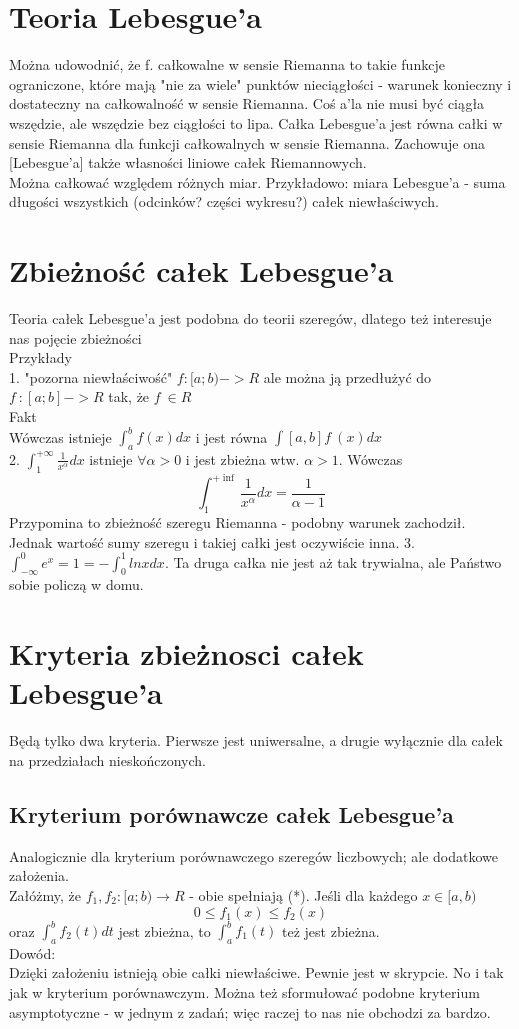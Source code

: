\documentclass[12pt,a4paper,article]{memoir} %
\begin{document}
\section{Teoria Lebesgue'a}
Można udowodnić, że f. całkowalne w sensie Riemanna to takie funkcje ograniczone, które mają "nie za wiele" punktów nieciągłości - warunek konieczny i dostateczny na całkowalność w sensie Riemanna. Coś a'la nie musi być ciągła wszędzie, ale wszędzie bez ciągłości to lipa.
Całka Lebesgue'a jest równa całki w sensie Riemanna dla funkcji całkowalnych w sensie Riemanna. Zachowuje ona [Lebesgue'a] także własności liniowe całek Riemannowych. \\
Można całkować względem różnych miar. Przykładowo: miara Lebesgue'a - suma długości wszystkich (odcinków? części wykresu?) całek niewłaściwych.
\section{Zbieżność całek Lebesgue'a}
Teoria całek Lebesgue'a jest podobna do teorii szeregów, dlatego też interesuje nas pojęcie zbieżności \\
Przykłady \\
1. "pozorna niewłaściwość"
$f : [a;b) -> R$ ale można ją przedłużyć do \\
$f^{~} : [a;b] -> R $ tak, że $ f^{~} \in R$ \\
Fakt \\
Wówczas istnieje $\int_{a}^{b} f(x) dx$ i jest równa $\int[a,b] f^{~}(x)dx $ \\
2. $ \int_{1}^{+\infty} \frac{1}{x^\alpha} dx $ istnieje $ \forall \alpha > 0 $ i jest zbieżna wtw. $ \alpha > 1 $. Wówczas \[ \int_{1}^{+\inf} \frac{1}{x^\alpha} dx = \frac{1}{\alpha - 1} \]
Przypomina to zbieżność szeregu Riemanna - podobny warunek zachodził. Jednak wartość sumy szeregu i takiej całki jest oczywiście inna.
3. $ \int_{-\infty}^{0} e^x = 1 = -\int_{0}^{1} lnx dx $. Ta druga całka nie jest aż tak trywialna, ale Państwo sobie policzą w domu.
\section{Kryteria zbieżnosci całek Lebesgue'a}
Będą tylko dwa kryteria. Pierwsze jest uniwersalne, a drugie wyłącznie dla całek na przedziałach nieskończonych.
\subsection{Kryterium porównawcze całek Lebesgue'a}
Analogicznie dla kryterium porównawczego szeregów liczbowych; ale dodatkowe założenia. \\
Załóżmy, że $f_1, f_2 : [a;b) \to R $ - obie spełniają (*).
Jeśli dla każdego $ x \in [a,b) $
\[ 0 \leq f_1(x) \leq f_2(x) \]
oraz $ \int_a^b f_2 (t)dt $ jest zbieżna, to $\int_a^b f_1 (t)$ też jest zbieżna. \\
Dowód: \\
Dzięki założeniu istnieją obie całki niewłaściwe. Pewnie jest w skrypcie. No i tak jak w kryterium porównawczym. Można też sformułować podobne kryterium asymptotyczne - w jednym z zadań; więc raczej to nas nie obchodzi za bardzo.
\end{document}
